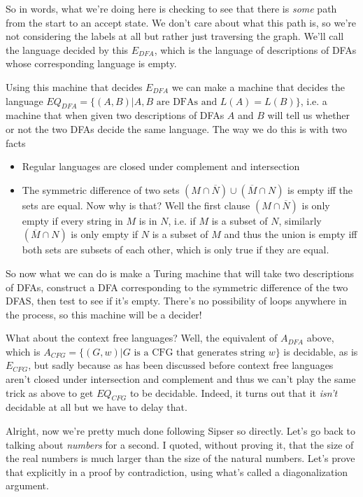 \documentclass[11pt]{article}
\begin{document}
So in words, what we're doing here is checking to see that there is \emph{some} path from the start to an accept state. We don't care about what this path is, so we're not considering the labels at all but rather just traversing the graph. We'll call the language decided by this $E_{DFA}$, which is the language of descriptions of DFAs whose corresponding language is empty. 

Using this machine that decides $E_{DFA}$ we can make a machine that decides the language $EQ_{DFA} = \{(A,B) | A,B \text{ are DFAs and } L(A)=L(B)\}$, i.e. a machine that when given two descriptions of DFAs $A$ and $B$ will tell us whether or not the two DFAs decide the same language. The way we do this is with two facts

\begin{itemize}
\item Regular languages are closed under complement and intersection
\item The symmetric difference of two sets $(M \cap \overline{N}) \cup (\overline{M} \cap N)$ is empty iff the sets are equal. Now why is that? Well the first clause $(M \cap \overline{N})$ is only empty if every string in $M$ is in $N$, i.e. if $M$ is a subset of $N$, similarly $(\overline{M} \cap N)$ is only empty if $N$ is a subset of $M$ and thus the union is empty iff both sets are subsets of each other, which is only true if they are equal.
\end{itemize}

So now what we can do is make a Turing machine that will take two descriptions of DFAs, construct a DFA corresponding to the symmetric difference of the two DFAS, then test to see if it's empty. There's no possibility of loops anywhere in the process, so this machine will be a decider!

What about the context free languages? Well, the equivalent of $A_{DFA}$ above, which is $A_{CFG} = \{(G,w) | G \text{ is a CFG that generates string } w\}$ is decidable, as is $E_{CFG}$, but sadly because as has been discussed before context free languages aren't closed under intersection and complement and thus we can't play the same trick as above to get $EQ_{CFG}$ to be decidable. Indeed, it turns out that it \emph{isn't} decidable at all but we have to delay that.

Alright, now we're pretty much done following Sipser so directly. Let's go back to talking about \emph{numbers} for a second. I quoted, without proving it, that the size of the real numbers is much larger than the size of the natural numbers. Let's prove that explicitly in a proof by contradiction, using what's called a diagonalization argument. 
\end{document}

